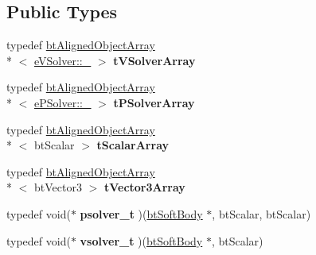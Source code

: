 \subsection*{Public Types}
\begin{DoxyCompactItemize}
\item 
\hypertarget{classbt_soft_body_a0f0ddd58ae989fdf6b725324860a7759}{typedef \hyperlink{classbt_aligned_object_array}{bt\+Aligned\+Object\+Array}\\*
$<$ \hyperlink{structbt_soft_body_1_1e_v_solver_ad6a7083f91529d75cab91506cd63e088}{e\+V\+Solver\+::\+\_\+} $>$ {\bfseries t\+V\+Solver\+Array}}\label{classbt_soft_body_a0f0ddd58ae989fdf6b725324860a7759}

\item 
\hypertarget{classbt_soft_body_ad5509369a941c46766748a84e4f5852c}{typedef \hyperlink{classbt_aligned_object_array}{bt\+Aligned\+Object\+Array}\\*
$<$ \hyperlink{structbt_soft_body_1_1e_p_solver_a5d6ab41a09da7333bc2047b4ea14bf86}{e\+P\+Solver\+::\+\_\+} $>$ {\bfseries t\+P\+Solver\+Array}}\label{classbt_soft_body_ad5509369a941c46766748a84e4f5852c}

\item 
\hypertarget{classbt_soft_body_afeb46b2922c843f33480c7f297eb5983}{typedef \hyperlink{classbt_aligned_object_array}{bt\+Aligned\+Object\+Array}\\*
$<$ bt\+Scalar $>$ {\bfseries t\+Scalar\+Array}}\label{classbt_soft_body_afeb46b2922c843f33480c7f297eb5983}

\item 
\hypertarget{classbt_soft_body_a8a258d7e5f9bb847ed754e5aa49e6a0e}{typedef \hyperlink{classbt_aligned_object_array}{bt\+Aligned\+Object\+Array}\\*
$<$ bt\+Vector3 $>$ {\bfseries t\+Vector3\+Array}}\label{classbt_soft_body_a8a258d7e5f9bb847ed754e5aa49e6a0e}

\item 
\hypertarget{classbt_soft_body_a89cc7db3d3f5a7189ad92d63e9b15ede}{typedef void($\ast$ {\bfseries psolver\+\_\+t} )(\hyperlink{classbt_soft_body}{bt\+Soft\+Body} $\ast$, bt\+Scalar, bt\+Scalar)}\label{classbt_soft_body_a89cc7db3d3f5a7189ad92d63e9b15ede}

\item 
\hypertarget{classbt_soft_body_ac030786831e87b8ecb9364a5e8bc2dc1}{typedef void($\ast$ {\bfseries vsolver\+\_\+t} )(\hyperlink{classbt_soft_body}{bt\+Soft\+Body} $\ast$, bt\+Scalar)}\label{classbt_soft_body_ac030786831e87b8ecb9364a5e8bc2dc1}


\end{DoxyCompactItemize}

